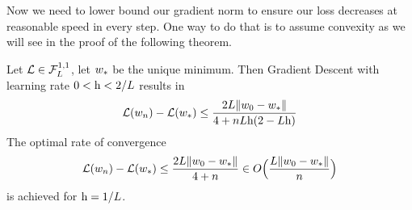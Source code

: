 Now we need to lower bound our gradient norm to ensure our loss decreases at
reasonable speed in every step. One way to do that is to assume convexity
as we will see in the proof of the following theorem.

\begin{theorem}
	\label{thm: convex function GD loss upper bound}
	Let \(\mathcal{L}\in\mathcal{F}^{1,1}_{L}\), let \(w_*\) be the unique minimum.
	Then Gradient Descent with learning rate \(0 < \text{h} < 2/L\) results in
	\begin{align}\label{eq: convex function loss upper bound}
		\mathcal{L}(w_n) - \mathcal{L}(w_*)
		\le \frac{2L\|w_0 - w_*\|}{4 + nL\text{h}(2-L\text{h})}
	\end{align}
	The optimal rate of convergence 
	\begin{align*}
		\mathcal{L}(w_n) - \mathcal{L}(w_*)
		\le \frac{2L\|w_0-w_*\|}{4+n}
		\in O\Big(\frac{L\|w_0-w_*\|}{n}\Big)
	\end{align*}
	is achieved for \(\text{h}=1/L\).
\end{theorem}

